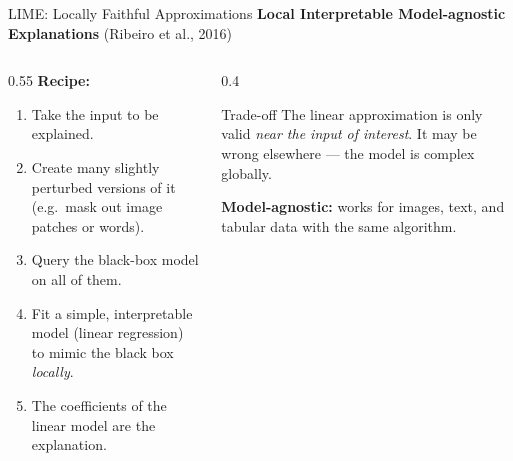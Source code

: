 \documentclass[aspectratio=169]{beamer}
\begin{document}
\begin{frame}{LIME: Locally Faithful Approximations}
  \textbf{Local Interpretable Model-agnostic Explanations} (Ribeiro et al., 2016)

  \vspace{0.5em}
  \begin{columns}[T]
    \begin{column}{0.55\textwidth}
      \textbf{Recipe:}
      \begin{enumerate}
        \item Take the input to be explained.
        \item Create many slightly perturbed versions of it
              (e.g.\ mask out image patches or words).
        \item Query the black-box model on all of them.
        \item Fit a simple, interpretable model (linear regression)
              to mimic the black box \emph{locally}.
        \item The coefficients of the linear model are the explanation.
      \end{enumerate}
    \end{column}
    \begin{column}{0.4\textwidth}
      \begin{alertblock}{Trade-off}
        The linear approximation is only valid
        \emph{near the input of interest}.
        It may be wrong elsewhere — the model is complex globally.
      \end{alertblock}

      \vspace{0.5em}
      \textbf{Model-agnostic:} works for images, text, and tabular data with
      the same algorithm.
    \end{column}
  \end{columns}
\end{frame}
\end{document}
